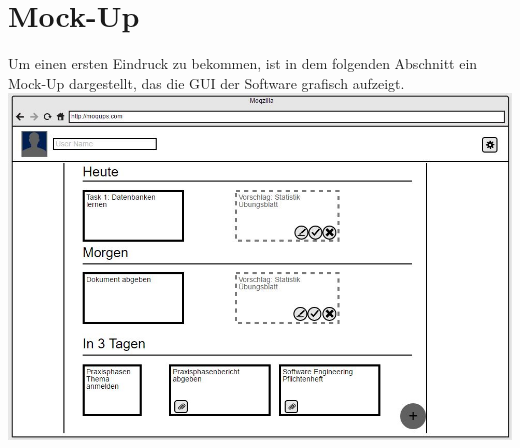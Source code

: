 
\chapter{Mock-Up}
Um einen ersten Eindruck zu bekommen, ist in dem folgenden Abschnitt ein Mock-Up dargestellt, das die GUI der Software grafisch aufzeigt.\\

\includegraphics[scale=0.6]{images/mock-up}


